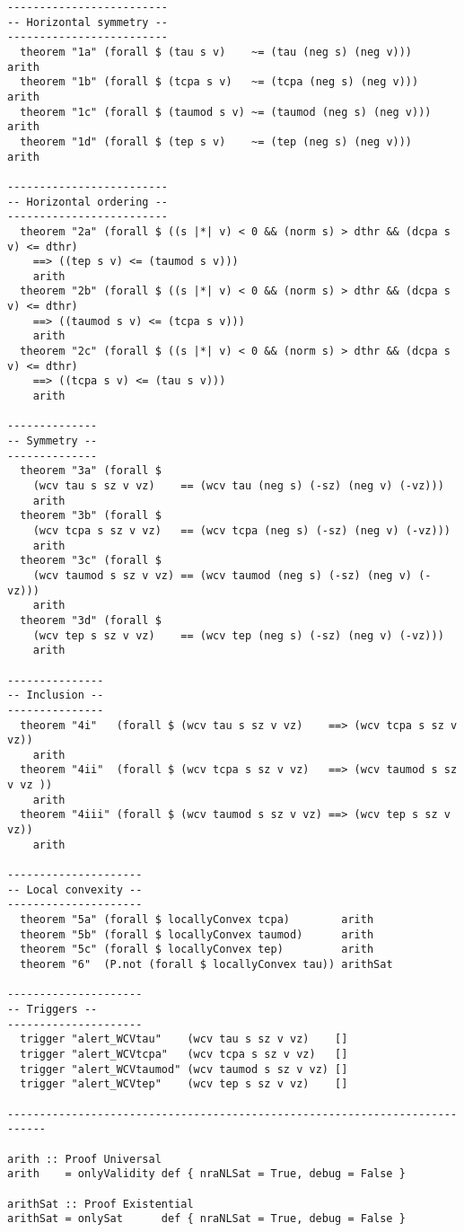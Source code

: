 \begin{lstlisting}[language=Copilot]
-------------------------
-- Horizontal symmetry --
-------------------------
  theorem "1a" (forall $ (tau s v)    ~= (tau (neg s) (neg v)))     arith
  theorem "1b" (forall $ (tcpa s v)   ~= (tcpa (neg s) (neg v)))    arith
  theorem "1c" (forall $ (taumod s v) ~= (taumod (neg s) (neg v)))  arith
  theorem "1d" (forall $ (tep s v)    ~= (tep (neg s) (neg v)))     arith

-------------------------
-- Horizontal ordering --
-------------------------
  theorem "2a" (forall $ ((s |*| v) < 0 && (norm s) > dthr && (dcpa s v) <= dthr)
    ==> ((tep s v) <= (taumod s v)))
    arith
  theorem "2b" (forall $ ((s |*| v) < 0 && (norm s) > dthr && (dcpa s v) <= dthr)
    ==> ((taumod s v) <= (tcpa s v)))
    arith
  theorem "2c" (forall $ ((s |*| v) < 0 && (norm s) > dthr && (dcpa s v) <= dthr)
    ==> ((tcpa s v) <= (tau s v)))
    arith

--------------
-- Symmetry --
--------------
  theorem "3a" (forall $
    (wcv tau s sz v vz)    == (wcv tau (neg s) (-sz) (neg v) (-vz)))
    arith
  theorem "3b" (forall $
    (wcv tcpa s sz v vz)   == (wcv tcpa (neg s) (-sz) (neg v) (-vz)))
    arith
  theorem "3c" (forall $
    (wcv taumod s sz v vz) == (wcv taumod (neg s) (-sz) (neg v) (-vz)))
    arith
  theorem "3d" (forall $
    (wcv tep s sz v vz)    == (wcv tep (neg s) (-sz) (neg v) (-vz)))
    arith

---------------
-- Inclusion --
---------------
  theorem "4i"   (forall $ (wcv tau s sz v vz)    ==> (wcv tcpa s sz v vz))
    arith
  theorem "4ii"  (forall $ (wcv tcpa s sz v vz)   ==> (wcv taumod s sz v vz ))
    arith
  theorem "4iii" (forall $ (wcv taumod s sz v vz) ==> (wcv tep s sz v vz))
    arith

---------------------
-- Local convexity --
---------------------
  theorem "5a" (forall $ locallyConvex tcpa)        arith
  theorem "5b" (forall $ locallyConvex taumod)      arith
  theorem "5c" (forall $ locallyConvex tep)         arith
  theorem "6"  (P.not (forall $ locallyConvex tau)) arithSat

---------------------
-- Triggers --
---------------------
  trigger "alert_WCVtau"    (wcv tau s sz v vz)    []
  trigger "alert_WCVtcpa"   (wcv tcpa s sz v vz)   []
  trigger "alert_WCVtaumod" (wcv taumod s sz v vz) []
  trigger "alert_WCVtep"    (wcv tep s sz v vz)    []

----------------------------------------------------------------------------

arith :: Proof Universal
arith    = onlyValidity def { nraNLSat = True, debug = False }

arithSat :: Proof Existential
arithSat = onlySat      def { nraNLSat = True, debug = False }

\end{lstlisting}

